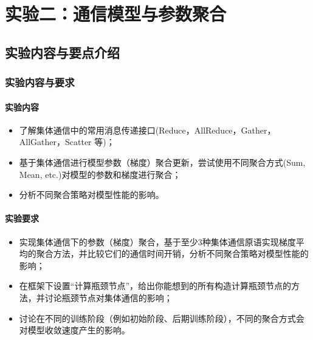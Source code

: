 \chapter{实验二：通信模型与参数聚合}

\section{实验内容与要点介绍}

\subsection{实验内容与要求}

\subsubsection{实验内容}
\begin{itemize}
    \item 了解集体通信中的常用消息传递接口(Reduce，AllReduce，Gather，AllGather，Scatter 等)；
    \item 基于集体通信进行模型参数（梯度）聚合更新，尝试使用不同聚合方式(Sum, Mean, etc.)对模型的参数和梯度进行聚合；
    \item 分析不同聚合策略对模型性能的影响。
\end{itemize}

\subsubsection{实验要求}
\begin{itemize}
    \item 实现集体通信下的参数（梯度）聚合，基于至少3种集体通信原语实现梯度平均的聚合方法，并比较它们的通信时间开销，分析不同聚合策略对模型性能的影响；
    \item 在框架下设置``计算瓶颈节点''，给出你能想到的所有构造计算瓶颈节点的方法，并讨论瓶颈节点对集体通信的影响；
    \item 讨论在不同的训练阶段（例如初始阶段、后期训练阶段），不同的聚合方式会对模型收敛速度产生的影响。
\end{itemize}

